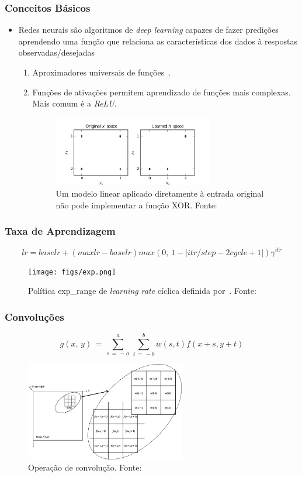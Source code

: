 \documentclass{beamer}
\begin{document}
\begin{frame}
\frametitle{Conceitos Básicos}
\begin{itemize}
\item Redes neurais são algoritmos de \textit{deep learning} capazes de fazer predições aprendendo uma função que relaciona as características dos dados à respostas observadas/desejadas
\begin{enumerate}
\item Aproximadores universais de funções~\cite{nn_book}.
\item Funções de ativações permitem aprendizado de funções mais complexas. Mais comum é a \textit{ReLU}.
\begin{figure}
\includegraphics[width=0.7\textwidth]{figs/xor.pdf}
\caption{Um modelo linear aplicado diretamente à entrada original não pode implementar a função XOR. Fonte:~\cite{dl_book}}
\end{figure}
\end{enumerate}
\end{itemize}
\end{frame}
\begin{frame}
\frametitle{Taxa de Aprendizagem}
\begin{equation} lr = baselr + (maxlr-baselr) max(0,\, 1-|itr/step - 2cycle + 1|) \gamma^{itr} \end{equation}
\begin{figure}
\texttt{[image: figs/exp.png]}
\caption{Política exp\_range de \textit{learning rate} cíclica definida por~\cite{clr}. Fonte:~\cite{exp}}
\end{figure}
\end{frame}
\begin{frame}
\frametitle{Convoluções}
\begin{equation} g(x,\, y) \,=\, \sum_{s\, =\, -a}^{a}\, \sum_{t\, =\, -b}^{b}{w(s,t)f(x + s, y + t)} \end{equation}
\begin{figure}
\includegraphics[width=0.62\textwidth]{figs/conv.pdf}
\caption{Operação de convolução. Fonte:~\cite{ipi}}
\end{figure}
\end{frame}
\end{document}
